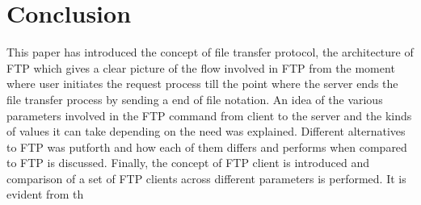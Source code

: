 \documentclass[9pt,twocolumn,twoside]{styles/osajnl}
\begin{document}
\section{Conclusion}

This paper has introduced the concept of file transfer protocol, the architecture of FTP which gives a clear picture of the flow involved in FTP from the moment where user initiates the request process till the point where the server ends the file transfer process by sending a end of file notation. An idea of the various parameters involved in the FTP command from client to the server and the kinds of values it can take depending on the need was explained. Different alternatives to FTP was putforth and how each of them differs and performs when compared to FTP is discussed. Finally, the concept of FTP client is introduced and comparison of a set of FTP clients across different parameters is performed. It is evident from th


\end{document}
